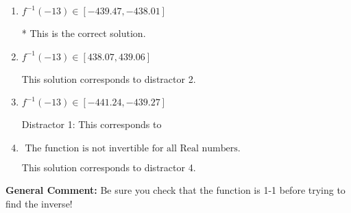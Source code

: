 \documentclass{extbook}[14pt]
\begin{document}
\begin{enumerate}
{\begin{enumerate}[label=\Alph*.]
 This solution corresponds to distractor 3.
\item \( f^{-1}(-13) \in [-439.47, -438.01] \)

* This is the correct solution.
\item \( f^{-1}(-13) \in [438.07, 439.06] \)

 This solution corresponds to distractor 2.
\item \( f^{-1}(-13) \in [-441.24, -439.27] \)

 Distractor 1: This corresponds to 
\item \( \text{ The function is not invertible for all Real numbers. } \)

 This solution corresponds to distractor 4.
\end{enumerate}

\textbf{General Comment:} Be sure you check that the function is 1-1 before trying to find the inverse!
}
\end{enumerate}
\end{document}
